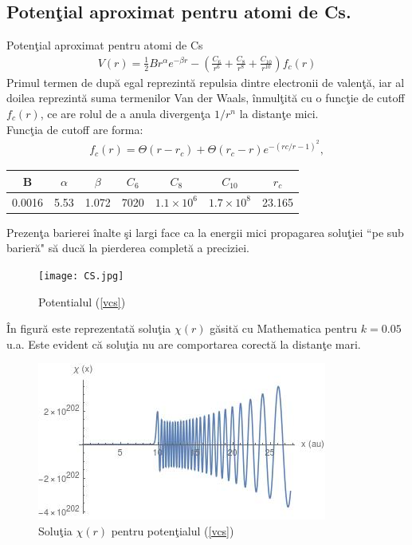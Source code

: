 \subsection{Poten\c{t}ial aproximat pentru atomi de Cs.}
\begin{frame}[allowframebreaks]{Poten\c{t}ial aproximat pentru atomi de Cs}
\begin{align}
V(r)=\frac{1}{2}Br^\alpha e^{-\beta r}-\left(\frac{C_6}{r^6}+\frac{C_8}{r^8}+\frac{C_{10}}{r^{10}}\right)f_c(r) \label{vcs}
\end{align}
Primul termen de dup\u{a} egal reprezint\u{a} repulsia dintre electronii de valen\c{t}\u{a}, iar al doilea reprezint\u{a} suma termenilor Van der Waals, \^{i}nmul\c{t}it\u{a} cu o func\c{t}ie de cutoff $f_c(r)$, ce are rolul de a anula divergen\c{t}a $1/r^n$ la distan\c{t}e mici.\\
Func\c{t}ia de cutoff are forma:
\begin{align}
f_c(r)=\Theta(r-r_c)+\Theta(r_c-r)e^{-(rc/r-1)^2},
\end{align}
\begin{center}
 \begin{tabular}{||c c c c c c c||} 
 \hline
 B & $\alpha$ & $\beta$ & $C_6$ & $C_8$ & $C_{10}$ & $r_c$ \\ [0.5ex] 
 \hline 
 0.0016 & 5.53 & 1.072 & 7020 & $1.1 \times 10^6$ & $1.7 \times 10^8$ & 23.165 \\ 
  \hline
\end{tabular}
\end{center}
\newpage
Prezen\c{t}a barierei \^{i}nalte \c{s}i largi face ca la energii mici propagarea solu\c{t}iei ``pe sub barier\u{a}" s\u{a} duc\u{a} la pierderea complet\u{a} a preciziei.
\begin{figure}[h!]
  \centering
  \texttt{[image: CS.jpg]}
  {\caption{Potentialul (\ref{vcs})\label{gvcs}}}
  \end{figure}
  \^{I}n figur\u{a} este reprezentat\u a solu\c tia $\chi(r)$ g\u asit\u a cu Mathematica pentru $k=0.05$ u.a. Este evident c\u a solu\c tia nu are comportarea corect\u a la distan\c te mari.
\begin{figure}[h!]
  \centering
  \includegraphics[scale = 0.8]{FIG.jpg}
  {\caption{Solu\c{t}ia $\chi(r)$ pentru poten\c{t}ialul (\ref{vcs})\label{figpsi}}}
  \end{figure}
  
\end{frame}

